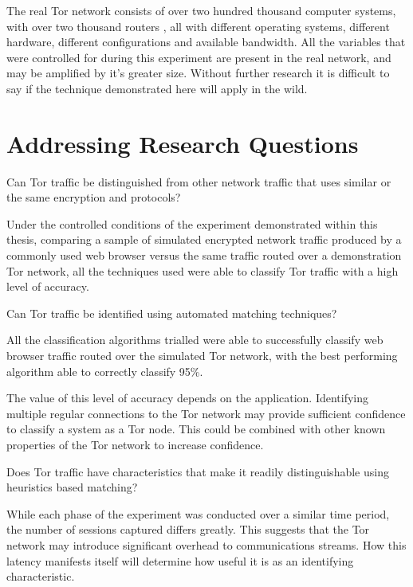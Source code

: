 The real Tor network consists of over two hundred thousand computer systems,
with over two thousand routers \parencite{TorStatus:2011fk}, all with different
operating systems, different hardware, different configurations and available
bandwidth. All the variables that were controlled for during this experiment
are present in the real network, and may be amplified by it's greater size.
Without further research it is difficult to say if the technique demonstrated
here will apply in the wild.

\section{Addressing Research Questions}

\begin{enumerate*}
  \item{Can Tor traffic be distinguished from other network traffic that uses
    similar or the same encryption and protocols?}

    Under the controlled conditions of the experiment demonstrated within this
    thesis, comparing a sample of simulated encrypted network traffic produced
    by a commonly used web browser versus the same traffic routed over a
    demonstration Tor network, all the techniques used were able to classify
    Tor traffic with a high level of accuracy.

  \item{Can Tor traffic be identified using automated matching techniques?}

    All the classification algorithms trialled were able to successfully classify
    web browser traffic routed over the simulated Tor network, with the best
    performing algorithm able to correctly classify 95\%.

    The value of this level of accuracy depends on the application. Identifying
    multiple regular connections to the Tor network may provide sufficient
    confidence to classify a system as a Tor node. This could be combined with
    other known properties of the Tor network to increase confidence.

  \item{Does Tor traffic have characteristics that make it readily distinguishable using
    heuristics based matching?}

    While each phase of the experiment was conducted over a similar time
    period, the number of sessions captured differs greatly. This suggests that
    the Tor network may introduce significant overhead to communications
    streams. How this latency manifests itself will determine how useful it is
    as an identifying characteristic.


\end{enumerate*}


